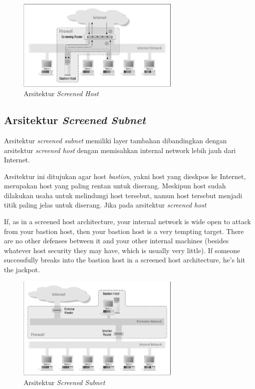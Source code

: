\begin{figure}[H]
	\centering
	\includegraphics[width=300px]{resources/screened_host.png}
	\caption{Arsitektur \textit{Screened Host}}
	\label{fig:screened_host}
\end{figure}

\subsection{Arsitektur \textit{Screened Subnet}}

Arsitektur \textit{screened subnet} memiliki layer tambahan dibandingkan dengan arsitektur \textit{screened host} dengan memisahkan internal network lebih jauh dari Internet.

Arsitektur ini ditujukan agar host \textit{bastion}, yakni host yang dieskpos ke Internet, merupakan host yang paling rentan untuk diserang. Meskipun host sudah dilakukan usaha untuk melindungi host tersebut, namun host tersebut menjadi titik paling jelas untuk diserang.
Jika pada arsitektur \textit{screened host}


 If, as in a screened host architecture, your internal network is wide open to attack from your bastion host, then your bastion host is a very tempting target. There are no other defenses between it and your other internal machines (besides whatever host security they may have, which is usually very little). If someone successfully breaks into the bastion host in a screened host architecture, he's hit the jackpot.

\begin{figure}[H]
	\centering
	\includegraphics[width=300px]{resources/screened_subnet.png}
	\caption{Arsitektur \textit{Screened Subnet}}
	\label{fig:screened_subnet}
\end{figure}

